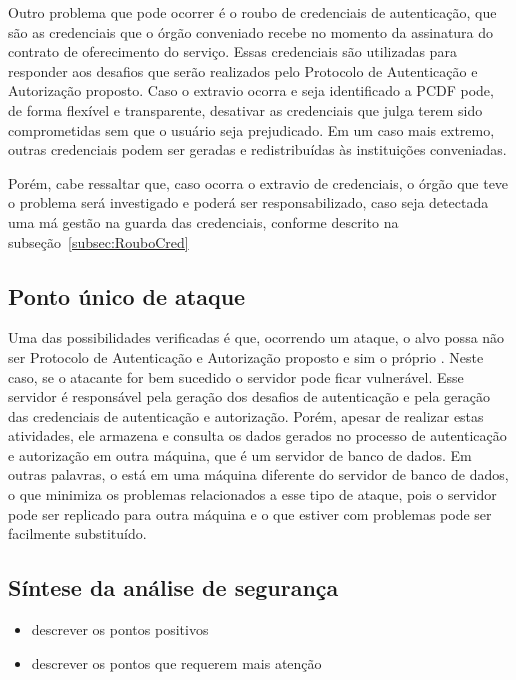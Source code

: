 Outro problema que pode ocorrer é o roubo de credenciais de autenticação, que são as credenciais que o órgão conveniado recebe no momento da assinatura do contrato de oferecimento do serviço. Essas credenciais são utilizadas para responder aos desafios que serão realizados pelo Protocolo de Autenticação e Autorização proposto. Caso o extravio ocorra e seja identificado a PCDF pode, de forma flexível e transparente, desativar as credenciais que julga terem sido comprometidas sem que o usuário seja prejudicado.
Em um caso mais extremo, outras credenciais podem ser geradas e redistribuídas \`{a}s institui\c c\~{o}es conveniadas.

Porém, cabe ressaltar que, caso ocorra o extravio de credenciais, o órgão que teve o problema será investigado e poderá ser responsabilizado, caso seja detectada uma má gestão na guarda das credenciais, conforme descrito na subseção~\ref{subsec:RouboCred}


\subsection{Ponto único de ataque}

Uma das possibilidades verificadas é que, ocorrendo um ataque, o alvo possa não ser Protocolo de Autenticação e Autorização proposto e sim o próprio \servidorAA.
Neste caso, se o atacante for bem sucedido o servidor pode ficar vulnerável. Esse servidor é responsável pela geração dos desafios de autenticação e pela geração das credenciais de autenticação e autorização. Porém, apesar de realizar estas atividades, ele armazena e consulta os dados gerados no processo de autenticação e autorização em outra máquina, que é um servidor de banco de dados. Em outras palavras, o \servidorAA está em uma máquina diferente do servidor de banco de dados, o que minimiza os problemas relacionados a esse tipo de ataque, pois o servidor pode ser replicado para outra máquina e o que estiver com problemas pode ser facilmente substituído.

\subsection{S\'{i}ntese da an\'{a}lise de seguran\c ca}

\begin{itemize}
\item descrever os pontos positivos
\item descrever os pontos que requerem mais aten\c c\~{a}o
\end{itemize}

